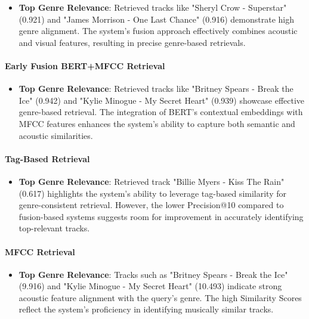 \documentclass[sigconf]{acmart}
\begin{document}
\begin{itemize}
    \item \textbf{Top Genre Relevance}: Retrieved tracks like "Sheryl Crow - Superstar" (0.921) and "James Morrison - One Last Chance" (0.916) demonstrate high genre alignment. The system's fusion approach effectively combines acoustic and visual features, resulting in precise genre-based retrievals.
\end{itemize}

\paragraph{Early Fusion BERT+MFCC Retrieval}

\begin{itemize}
    \item \textbf{Top Genre Relevance}: Retrieved tracks like "Britney Spears - Break the Ice" (0.942) and "Kylie Minogue - My Secret Heart" (0.939) showcase effective genre-based retrieval. The integration of BERT's contextual embeddings with MFCC features enhances the system's ability to capture both semantic and acoustic similarities.
\end{itemize}

\paragraph{Tag-Based Retrieval}

\begin{itemize}
    \item \textbf{Top Genre Relevance}: Retrieved track "Billie Myers - Kiss The Rain" (0.617) highlights the system's ability to leverage tag-based similarity for genre-consistent retrieval. However, the lower Precision@10 compared to fusion-based systems suggests room for improvement in accurately identifying top-relevant tracks.
\end{itemize}

\paragraph{MFCC Retrieval}

\begin{itemize}
    \item \textbf{Top Genre Relevance}: Tracks such as "Britney Spears - Break the Ice" (9.916) and "Kylie Minogue - My Secret Heart" (10.493) indicate strong acoustic feature alignment with the query's genre. The high Similarity Scores reflect the system's proficiency in identifying musically similar tracks.
\end{itemize}
\end{document}
